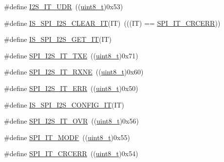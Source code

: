 \begin{DoxyCompactItemize}
\#define \hyperlink{group___s_p_i___i2_s__interrupts__definition_ga54aba7dc06f97fb4839de5f42bd5a47d}{I2\+S\+\_\+\+I\+T\+\_\+\+U\+DR}~((\hyperlink{_p_e___types_8h_aba7bc1797add20fe3efdf37ced1182c5}{uint8\+\_\+t})0x53)
\item 
\#define \hyperlink{group___s_p_i___i2_s__interrupts__definition_gabeb917a0a708af0439f753a5f4af4c5e}{I\+S\+\_\+\+S\+P\+I\+\_\+\+I2\+S\+\_\+\+C\+L\+E\+A\+R\+\_\+\+IT}(IT)~(((IT) == \hyperlink{openmotestm_2library_2inc_2stm32f10x__spi_8h_a9aa97a5ce8d3500dc14ca4e30eada199}{S\+P\+I\+\_\+\+I\+T\+\_\+\+C\+R\+C\+E\+RR}))
\item 
\#define \hyperlink{group___s_p_i___i2_s__interrupts__definition_gacb2949c066a74f1c4ef8c6a0d4e14a0c}{I\+S\+\_\+\+S\+P\+I\+\_\+\+I2\+S\+\_\+\+G\+E\+T\+\_\+\+IT}(IT)
\item 
\#define \hyperlink{group___s_p_i___i2_s__interrupts__definition_ga0f192977fdb12c40d35672b8ae074724}{S\+P\+I\+\_\+\+I2\+S\+\_\+\+I\+T\+\_\+\+T\+XE}~((\hyperlink{_p_e___types_8h_aba7bc1797add20fe3efdf37ced1182c5}{uint8\+\_\+t})0x71)
\item 
\#define \hyperlink{group___s_p_i___i2_s__interrupts__definition_gae46dd53cd2e4ad8b8a7836d3dcec57ea}{S\+P\+I\+\_\+\+I2\+S\+\_\+\+I\+T\+\_\+\+R\+X\+NE}~((\hyperlink{_p_e___types_8h_aba7bc1797add20fe3efdf37ced1182c5}{uint8\+\_\+t})0x60)
\item 
\#define \hyperlink{group___s_p_i___i2_s__interrupts__definition_ga1d9d4916bf7ae315f23a54ecfbcd9157}{S\+P\+I\+\_\+\+I2\+S\+\_\+\+I\+T\+\_\+\+E\+RR}~((\hyperlink{_p_e___types_8h_aba7bc1797add20fe3efdf37ced1182c5}{uint8\+\_\+t})0x50)
\item 
\#define \hyperlink{group___s_p_i___i2_s__interrupts__definition_ga3ec2f6950d7ff801f992e65593c3365e}{I\+S\+\_\+\+S\+P\+I\+\_\+\+I2\+S\+\_\+\+C\+O\+N\+F\+I\+G\+\_\+\+IT}(IT)
\item 
\#define \hyperlink{group___s_p_i___i2_s__interrupts__definition_ga279c30176e8ff7e2ec299774a2e88f45}{S\+P\+I\+\_\+\+I2\+S\+\_\+\+I\+T\+\_\+\+O\+VR}~((\hyperlink{_p_e___types_8h_aba7bc1797add20fe3efdf37ced1182c5}{uint8\+\_\+t})0x56)
\item 
\#define \hyperlink{group___s_p_i___i2_s__interrupts__definition_ga0b9780d5f31fd80f4d0fa7d6860041e9}{S\+P\+I\+\_\+\+I\+T\+\_\+\+M\+O\+DF}~((\hyperlink{_p_e___types_8h_aba7bc1797add20fe3efdf37ced1182c5}{uint8\+\_\+t})0x55)
\item 
\#define \hyperlink{group___s_p_i___i2_s__interrupts__definition_ga9aa97a5ce8d3500dc14ca4e30eada199}{S\+P\+I\+\_\+\+I\+T\+\_\+\+C\+R\+C\+E\+RR}~((\hyperlink{_p_e___types_8h_aba7bc1797add20fe3efdf37ced1182c5}{uint8\+\_\+t})0x54)

\end{DoxyCompactItemize}
